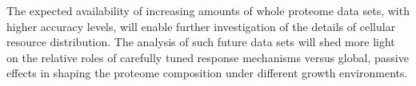 The expected availability of increasing amounts of whole proteome data sets, with higher accuracy levels, will enable further investigation of the details of cellular resource distribution.
The analysis of such future data sets will shed more light on the relative roles of carefully tuned response mechanisms versus global, passive effects in shaping the proteome composition under different growth environments.